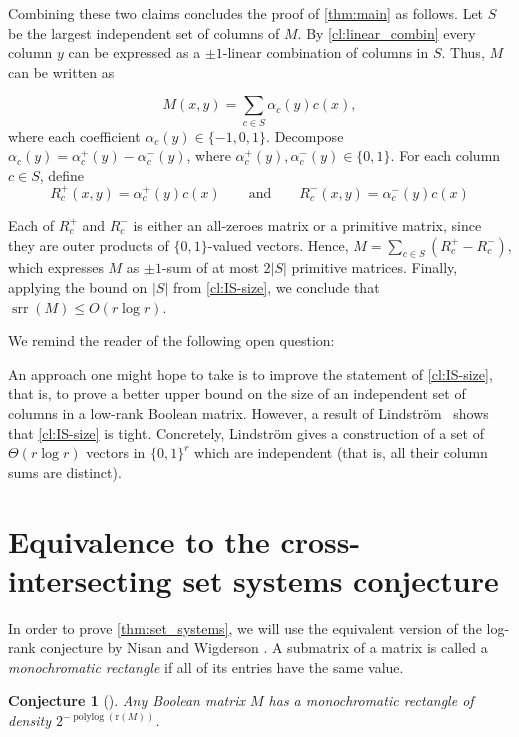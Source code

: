 \documentclass[11pt]{article}
\theoremstyle{plain}
\newtheorem{conjecture}[thm]{Conjecture}
\theoremstyle{remark}
\def\r{{\mathrm{r}}}
\DeclareMathOperator{\ur}{srr}
\DeclareMathOperator{\polylog}{polylog}
\begin{document}
Combining these two claims concludes the proof of \cref{thm:main} as follows. Let $S$ be the largest independent set of columns of $M$. By \cref{cl:linear_combin} every column $y$ can be expressed as a $\pm 1$-linear combination of  columns in $S$. Thus, $M$ can be written as

\[ M(x, y) = \sum_{c \in S} \alpha_{c}(y) c(x), \]
where each coefficient $\alpha_{c}(y)\in \{-1, 0, 1\}$. Decompose $\alpha_{c}(y) = \alpha_{c}^{+}(y) - \alpha_{c}^{-}(y)$, where $\alpha_{c}^{+}(y), \alpha_{c}^{-}(y) \in \{0,1\}$.
For each column $c \in S$, define
\[ R_c^{+}(x, y) = \alpha_{c}^{+}(y) c(x) \qquad \mbox{and} \qquad R_c^{-}(x, y) = \alpha_{c}^{-}(y) c(x) \]

Each of $R^{+}_c$ and $R^{-}_c$ is either an all-zeroes matrix or a primitive matrix, since they are outer products of $\{0, 1\}$-valued vectors. Hence, $M = \sum_{c \in S} (R_c^{+}- R_c^{-})$, which expresses $M$ as $\pm 1$-sum of at most $2|S|$ primitive matrices. Finally, applying the bound on $|S|$ from \cref{cl:IS-size}, we conclude that $\ur(M) \leq O(r \log r)$.

We remind the reader of the following open question:

\QuestionTightness*

An approach one might hope to take is to improve the statement of \cref{cl:IS-size}, that is, to prove a better upper bound on the size of an independent set of columns in a low-rank Boolean matrix. However, a result of Lindström~\cite[Theorem 1]{LinCombinatorial1965} shows that \cref{cl:IS-size} is tight. Concretely, Lindström gives a construction of a set of $\Theta(r \log r)$ vectors in $\{0,1\}^r$ which are independent (that is, all their column sums are distinct).



\section{Equivalence to the cross-intersecting set systems conjecture}\label{sec:set_systems}
In order to prove \cref{thm:set_systems}, we will use the equivalent version of the log-rank conjecture by Nisan and Wigderson \cite{NW}. A submatrix of a matrix is called a \emph{monochromatic rectangle} if all of its entries have the same value.
\begin{conjecture}[\cite{NW}]\label{conj:nw}
	Any Boolean matrix $M$ has a monochromatic rectangle of density $2^{-\polylog(\r(M))}$.
\end{conjecture}
\end{document}
